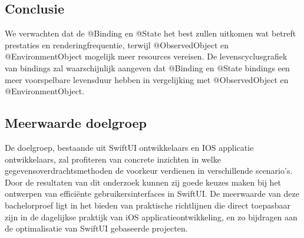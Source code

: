 \subsection{Conclusie}
We verwachten dat de @Binding en @State het best zullen uitkomen wat betreft prestaties en renderingfrequentie, terwijl @ObservedObject en @EnvironmentObject mogelijk meer resources vereisen. De levenscyclusgrafiek van bindings zal waarschijnlijk aangeven dat @Binding en @State bindings een meer voorspelbare levensduur hebben in vergelijking met @ObservedObject en @EnvironmentObject.

\subsection{Meerwaarde doelgroep}
De doelgroep, bestaande uit SwiftUI ontwikkelaars en IOS applicatie ontwikkelaars, zal profiteren van concrete inzichten in welke gegevensoverdrachtsmethoden de voorkeur verdienen in verschillende scenario's. Door de resultaten van dit onderzoek kunnen zij goede keuzes maken bij het ontwerpen van efficiënte gebruikersinterfaces in SwiftUI. De meerwaarde van deze bachelorproef ligt in het bieden van praktische richtlijnen die direct toepasbaar zijn in de dagelijkse praktijk van iOS applicatieontwikkeling, en zo bijdragen aan de optimalisatie van SwiftUI gebaseerde projecten.


